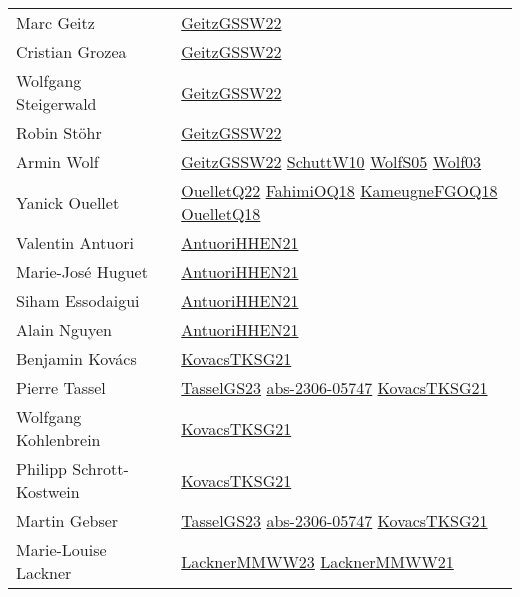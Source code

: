 {\begin{longtable}{p{4cm}p{15cm}}
Marc Geitz & \href{papers/GeitzGSSW22.pdf}{GeitzGSSW22}\cite{GeitzGSSW22} \\
Cristian Grozea & \href{papers/GeitzGSSW22.pdf}{GeitzGSSW22}\cite{GeitzGSSW22} \\
Wolfgang Steigerwald & \href{papers/GeitzGSSW22.pdf}{GeitzGSSW22}\cite{GeitzGSSW22} \\
Robin St{\"{o}}hr & \href{papers/GeitzGSSW22.pdf}{GeitzGSSW22}\cite{GeitzGSSW22} \\
Armin Wolf & \href{papers/GeitzGSSW22.pdf}{GeitzGSSW22}\cite{GeitzGSSW22} \href{papers/SchuttW10.pdf}{SchuttW10}\cite{SchuttW10} \href{papers/WolfS05.pdf}{WolfS05}\cite{WolfS05} \href{papers/Wolf03.pdf}{Wolf03}\cite{Wolf03} \\
Yanick Ouellet & \href{papers/OuelletQ22.pdf}{OuelletQ22}\cite{OuelletQ22} \href{articles/FahimiOQ18.pdf}{FahimiOQ18}\cite{FahimiOQ18} \href{papers/KameugneFGOQ18.pdf}{KameugneFGOQ18}\cite{KameugneFGOQ18} \href{papers/OuelletQ18.pdf}{OuelletQ18}\cite{OuelletQ18} \\
Valentin Antuori & \href{papers/AntuoriHHEN21.pdf}{AntuoriHHEN21}\cite{AntuoriHHEN21} \\
Marie{-}Jos{\'{e}} Huguet & \href{papers/AntuoriHHEN21.pdf}{AntuoriHHEN21}\cite{AntuoriHHEN21} \\
Siham Essodaigui & \href{papers/AntuoriHHEN21.pdf}{AntuoriHHEN21}\cite{AntuoriHHEN21} \\
Alain Nguyen & \href{papers/AntuoriHHEN21.pdf}{AntuoriHHEN21}\cite{AntuoriHHEN21} \\
Benjamin Kov{\'{a}}cs & \href{papers/KovacsTKSG21.pdf}{KovacsTKSG21}\cite{KovacsTKSG21} \\
Pierre Tassel & \href{papers/TasselGS23.pdf}{TasselGS23}\cite{TasselGS23} \href{articles/abs-2306-05747.pdf}{abs-2306-05747}\cite{abs-2306-05747} \href{papers/KovacsTKSG21.pdf}{KovacsTKSG21}\cite{KovacsTKSG21} \\
Wolfgang Kohlenbrein & \href{papers/KovacsTKSG21.pdf}{KovacsTKSG21}\cite{KovacsTKSG21} \\
Philipp Schrott{-}Kostwein & \href{papers/KovacsTKSG21.pdf}{KovacsTKSG21}\cite{KovacsTKSG21} \\
Martin Gebser & \href{papers/TasselGS23.pdf}{TasselGS23}\cite{TasselGS23} \href{articles/abs-2306-05747.pdf}{abs-2306-05747}\cite{abs-2306-05747} \href{papers/KovacsTKSG21.pdf}{KovacsTKSG21}\cite{KovacsTKSG21} \\
Marie{-}Louise Lackner & \href{articles/LacknerMMWW23.pdf}{LacknerMMWW23}\cite{LacknerMMWW23} \href{papers/LacknerMMWW21.pdf}{LacknerMMWW21}\cite{LacknerMMWW21} \\

\end{longtable}}
